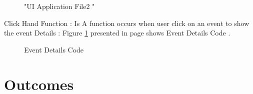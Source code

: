 \documentclass[12pt,a4paper,class,twoside,openany]{report}
\begin{document}
{\begin{figure}
\begin{center}
{}
\caption{"UI Application File2 "}
\label{fg:7-8}
\end{center}
\end{figure}
Click Hand Function : Is A function occurs when user click on an event to show the event Details :
Figure \ref{fg:7-8} presented in page \pageref{fg:7-9} shows Event Details Code .
\begin{figure}
\begin{center}
\caption{Event Details Code}
\label{fg:7-9}
\end{center}
\end{figure}
\cleardoublepage
 \chapter{Outcomes}

}
\end{document}
